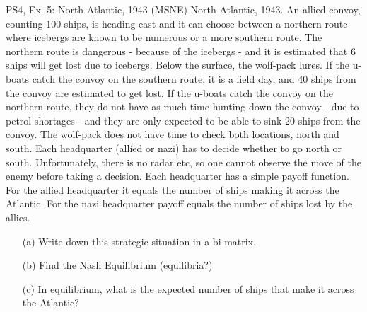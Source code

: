 \begin{frame}{PS4, Ex. 5: North-Atlantic, 1943 (MSNE)}
  North-Atlantic, 1943. An allied convoy, counting 100 ships, is heading east and it can choose between a northern route where icebergs are known to be numerous or a more southern route. The northern route is dangerous - because of the icebergs - and it is estimated that 6 ships will get lost due to icebergs. Below the surface, the wolf-pack lures. If the u-boats catch the convoy on the southern route, it is a field day, and 40 ships from the convoy are estimated to get lost. If the u-boats catch the convoy on the northern route, they do not have as much time hunting down the convoy - due to petrol shortages - and they are only expected to be able to sink 20 ships from the convoy. The wolf-pack does not have time to check both locations, north and south. Each headquarter (allied or nazi) has to decide whether to go north or south. Unfortunately, there is no radar etc, so one cannot observe the move of the enemy before taking a decision. Each headquarter has a simple payoff function. For the allied headquarter it equals the number of ships making it across the Atlantic. For the nazi headquarter payoff equals the number of ships lost by the allies.
  \begin{itemize}
    \item[(a)] Write down this strategic situation in a bi-matrix.
    \item[(b)] Find the Nash Equilibrium (equilibria?)
    \item[(c)] In equilibrium, what is the expected number of ships that make it across the Atlantic?
  \end{itemize}
  \vfill\null
\end{frame}

